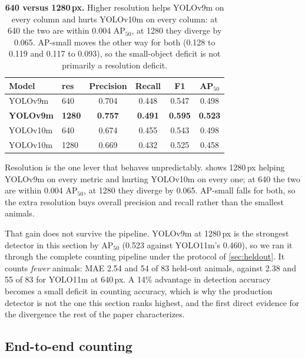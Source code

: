 \begin{table}[t]
\centering\small
\setlength{\tabcolsep}{5pt}
\begin{tabular}{llcccc}
\toprule
Model & res & Precision & Recall & F1 & AP$_{50}$ \\
\midrule
YOLOv9m & 640 & 0.704 & 0.448 & 0.547 & 0.498 \\
\textbf{YOLOv9m} & \textbf{1280} & \textbf{0.757} & \textbf{0.491} & \textbf{0.595} & \textbf{0.523} \\
YOLOv10m & 640 & 0.674 & 0.455 & 0.543 & 0.498 \\
YOLOv10m & 1280 & 0.669 & 0.432 & 0.525 & 0.458 \\
\bottomrule
\end{tabular}
\caption{\textbf{640 versus 1280\,px.} Higher resolution helps YOLOv9m on every column and
hurts YOLOv10m on every column: at 640 the two are within 0.004 AP$_{50}$, at 1280 they
diverge by 0.065. AP-small moves the other way for both (0.128 to 0.119 and 0.117 to 0.093),
so the small-object deficit is not primarily a resolution deficit.}
\label{tab:resolution}
\end{table}

Resolution is the one lever that behaves unpredictably.  shows
1280\,px helping YOLOv9m on every metric and hurting YOLOv10m on every one; at 640 the two
are within 0.004 AP$_{50}$, at 1280 they diverge by 0.065. AP-small falls for both, so the
extra resolution buys overall precision and recall rather than the smallest animals.

That gain does not survive the pipeline. YOLOv9m at 1280\,px is the strongest detector in
this section by AP$_{50}$ (0.523 against YOLO11m's 0.460), so we ran it through the complete
counting pipeline under the protocol of \cref{sec:heldout}. It counts \emph{fewer} animals:
MAE 2.54 and 54 of 83 held-out animals, against 2.38 and 55 of 83 for YOLO11m at 640\,px.
A 14\% advantage in detection accuracy becomes a small deficit in counting accuracy, which
is why the production detector is not the one this section ranks highest, and the first
direct evidence for the divergence the rest of the paper characterizes.

\subsection{End-to-end counting}
\label{sec:counting}

